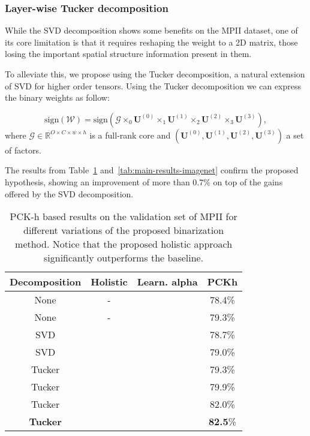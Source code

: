 \documentclass[10pt,twocolumn,letterpaper]{article}
\newcommand{\xmark}{\ding{55}}
\newcommand{\mytensor}[1]{\ensuremath{\mathcal{#1}}}
\newcommand{\mymatrix}[1]{\ensuremath{\mathbf{#1}}}
\begin{document}
\subsubsection{Layer-wise Tucker decomposition}\label{sssec:layer-wise-tucker}

While the SVD decomposition shows some benefits on the MPII dataset, one of its core limitation is that it requires reshaping the weight to a 2D matrix, those losing the important spatial structure information present in them.

To alleviate this, we propose using the Tucker decomposition, a natural extension of SVD for higher order tensors. Using the Tucker decomposition we can express the binary weights as follow:

\begin{equation}\label{eq:binarize-tucker}
    \text{sign}(\mytensor{W}) = \text{sign}(\mytensor{G} \times_0 \mymatrix{U}^{(0)} \times_1 \mymatrix{U}^{(1)} \times_2 \mymatrix{U}^{(2)}  \times_3 \mymatrix{U}^{(3)}),
\end{equation}
where $\mytensor{G} \in \mathbb{R}^{O \times C \times w \times h} $ is a full-rank core and $(\mymatrix{U}^{(0)},\mymatrix{U}^{(1)},\mymatrix{U}^{(2)},\mymatrix{U}^{(3)})$ a set of factors.

The results from Table~\ref{tab:main-results-mpii} and~\ref{tab:main-results-imagenet} confirm the proposed hypothesis, showing an improvement of more than 0.7\% on top of the gains offered by the SVD decomposition. 

\begin{table}[!htbp]
\vspace{10pt}
\small
	\begin{center}
		\begin{tabular}{|c|c|c|c|}
			\hline
			Decomposition & Holistic & Learn. alpha & PCKh \\
			\hline\hline
			None & - & \xmark  & 78.4\% \\
			None & - & \checkmark  & 79.3\% \\
			SVD & \xmark & \xmark  & 78.7\% \\
			SVD & \xmark & \checkmark  & 79.0\% \\
			Tucker & \xmark & \xmark  & 79.3\% \\
			Tucker & \xmark & \checkmark  & 79.9\% \\
			Tucker & \checkmark & \xmark  & 82.0\% \\
			\textbf{Tucker} & \checkmark & \checkmark  & \textbf{82.5}\% \\
			
            \hline
		\end{tabular}
	\end{center}
	\caption{PCK-h based results on the validation set of MPII for different variations of the proposed binarization method. Notice that the proposed holistic approach significantly outperforms the baseline.}
	\label{tab:main-results-mpii}
\end{table}
\end{document}
